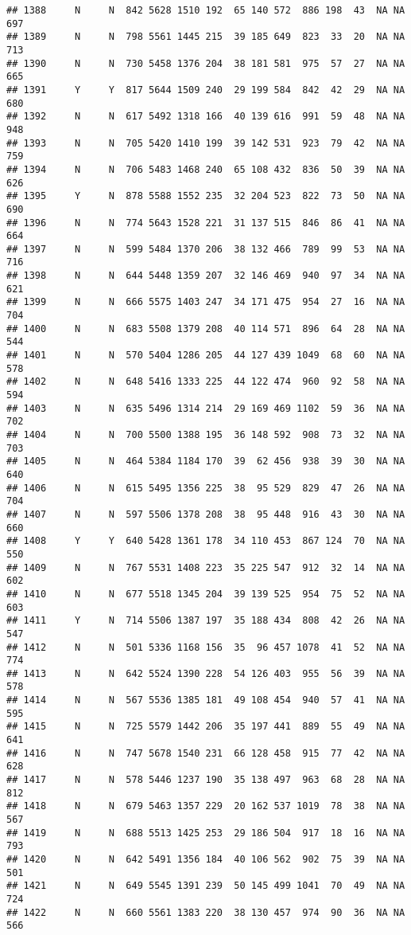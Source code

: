 \documentclass[]{article}
\begin{document}
\begin{verbatim}
## 1388     N     N  842 5628 1510 192  65 140 572  886 198  43  NA NA  697
## 1389     N     N  798 5561 1445 215  39 185 649  823  33  20  NA NA  713
## 1390     N     N  730 5458 1376 204  38 181 581  975  57  27  NA NA  665
## 1391     Y     Y  817 5644 1509 240  29 199 584  842  42  29  NA NA  680
## 1392     N     N  617 5492 1318 166  40 139 616  991  59  48  NA NA  948
## 1393     N     N  705 5420 1410 199  39 142 531  923  79  42  NA NA  759
## 1394     N     N  706 5483 1468 240  65 108 432  836  50  39  NA NA  626
## 1395     Y     N  878 5588 1552 235  32 204 523  822  73  50  NA NA  690
## 1396     N     N  774 5643 1528 221  31 137 515  846  86  41  NA NA  664
## 1397     N     N  599 5484 1370 206  38 132 466  789  99  53  NA NA  716
## 1398     N     N  644 5448 1359 207  32 146 469  940  97  34  NA NA  621
## 1399     N     N  666 5575 1403 247  34 171 475  954  27  16  NA NA  704
## 1400     N     N  683 5508 1379 208  40 114 571  896  64  28  NA NA  544
## 1401     N     N  570 5404 1286 205  44 127 439 1049  68  60  NA NA  578
## 1402     N     N  648 5416 1333 225  44 122 474  960  92  58  NA NA  594
## 1403     N     N  635 5496 1314 214  29 169 469 1102  59  36  NA NA  702
## 1404     N     N  700 5500 1388 195  36 148 592  908  73  32  NA NA  703
## 1405     N     N  464 5384 1184 170  39  62 456  938  39  30  NA NA  640
## 1406     N     N  615 5495 1356 225  38  95 529  829  47  26  NA NA  704
## 1407     N     N  597 5506 1378 208  38  95 448  916  43  30  NA NA  660
## 1408     Y     Y  640 5428 1361 178  34 110 453  867 124  70  NA NA  550
## 1409     N     N  767 5531 1408 223  35 225 547  912  32  14  NA NA  602
## 1410     N     N  677 5518 1345 204  39 139 525  954  75  52  NA NA  603
## 1411     Y     N  714 5506 1387 197  35 188 434  808  42  26  NA NA  547
## 1412     N     N  501 5336 1168 156  35  96 457 1078  41  52  NA NA  774
## 1413     N     N  642 5524 1390 228  54 126 403  955  56  39  NA NA  578
## 1414     N     N  567 5536 1385 181  49 108 454  940  57  41  NA NA  595
## 1415     N     N  725 5579 1442 206  35 197 441  889  55  49  NA NA  641
## 1416     N     N  747 5678 1540 231  66 128 458  915  77  42  NA NA  628
## 1417     N     N  578 5446 1237 190  35 138 497  963  68  28  NA NA  812
## 1418     N     N  679 5463 1357 229  20 162 537 1019  78  38  NA NA  567
## 1419     N     N  688 5513 1425 253  29 186 504  917  18  16  NA NA  793
## 1420     N     N  642 5491 1356 184  40 106 562  902  75  39  NA NA  501
## 1421     N     N  649 5545 1391 239  50 145 499 1041  70  49  NA NA  724
## 1422     N     N  660 5561 1383 220  38 130 457  974  90  36  NA NA  566

\end{verbatim}
\end{document}
